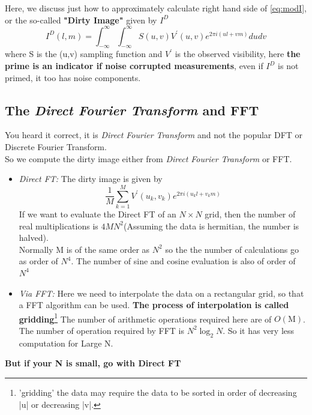 \documentclass[10pt]{report}
\newcommand{\tbf}[1]{\textbf{#1}}
\newcommand{\tit}[1]{\textit{#1}}
\newcommand{\fn}[1]{\footnote{#1}}
\begin{document}
Here, we discuss just how to approximately calculate right hand side of \eqref{eq:modI}, or the so-called \tbf{"Dirty Image"} given by $I^D$
\begin{equation}\label{eq:DirtyI}
I^D(l,m)=\int^\infty _{-\infty}  \int^\infty _{-\infty} S(u,v) V^\prime (u,v) e^{2 \pi i(ul+vm)}du dv
\end{equation}
where S is the (u,v) sampling function and $V^\prime$ is the observed visibility, here \tbf{the prime is an indicator if noise corrupted measurements}, even if $I^D$ is not primed, it too has noise components.

\subsection{The \tit{Direct Fourier Transform} and FFT}
You heard it correct, it is \tit{Direct Fourier Transform} and not the popular DFT or Discrete Fourier Transform.\\

 So we compute the dirty image either from \tit{Direct Fourier Transform} or FFT.\\
 
 \begin{itemize}
 \item \tit{Direct FT:} The dirty image is given by
 \begin{equation}
 \frac{1}{M}\sum^M _{k=1} V^\prime (u_k,v_k)e^{2 \pi i(u_k l+v_k m)}
 \end{equation}
 If we want to evaluate the Direct FT of an $N \times N$ grid, then the number of real multiplications is $4MN^2$(Assuming the data is hermitian, the number is halved).\\
 
 Normally M is of the same order as $N^2$ so the the number of calculations go as order of $N^4$. The number of sine and cosine evaluation is also of order of $N^4$\\
 
 \item \tit{Via FFT:} Here we need to interpolate the data on a rectangular grid, so that a FFT algorithm can be used. \tbf{The process of interpolation is called gridding}\fn{'gridding' the data may require the data to be sorted in order of decreasing |u| or decreasing |v|.} The number of arithmetic operations required here are of $O(\text{M})$. The number of operation required by FFT is $N^2\log_2 N$. So it has very less computation for Large N. 
 \end{itemize}
 \tbf{But if your N is small, go with Direct FT}
\end{document}
